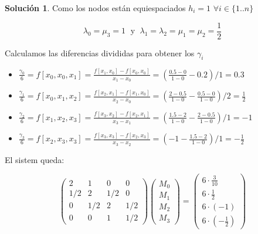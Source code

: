 \documentclass[11pt,spanish,]{article}
\theoremstyle{definition} \newtheorem*{definicion}{Definición}
\newtheorem*{solucion}{Solución}
\begin{document}
\begin{solucion}
Como los nodos están equiespaciados $h_i=1$ $\forall i \in \{1..n\}$

$$\lambda_0 = \mu_3 = 1 \; \text{ y } \; \lambda_1=\lambda_2=\mu_1=\mu_2= \frac{1}{2}$$

Calculamos las diferencias divididas para obtener los $\gamma_i$

\begin{itemize}

\item $\displaystyle\frac{\gamma_0}{6} = f[x_0,x_0,x_1] =  \frac{f[x_1,x_0]-f[x_0,x_0]}{x_1-x_0} = \left(\frac{0.5-0}{1-0}-0.2\right)/1 = 0.3$

\item $\displaystyle\frac{\gamma_1}{6} = f{[x_0,x_1,x_2]} =  \frac{f{[x_2,x_1]}-f{[x_1,x_0]} }{ x_2-x_0 } = \left(\frac{2-0.5}{1-0}-\frac{0.5-0}{1-0}\right)/2 = \frac{1}{2}$

\item $\displaystyle\frac{\gamma_2}{6} = f{[x_1,x_2,x_3]} =  \frac{ f{[x_3,x_2]}-f{[x_2,x_1]} }{ x_3-x_1 } = \left(\frac{1.5-2}{1-0}-\frac{2-0.5}{1-0}\right)/1 = -1$

\item $\displaystyle\frac{\gamma_3}{6} = f{[x_2,x_3,x_3]} =  \frac{ f{[x_3,x_3]}-f{[x_2,x_3]} }{ x_3-x_2 } = \left(-1-\frac{1.5-2}{1-0}\right)/1 = -\frac{1}{2}$
\end{itemize}

El sistem queda:

\begin{equation*}
\begin{pmatrix}
    2 & 1 & 0 & 0  \\
    1/2 & 2 & 1/2 & 0  \\
    0 & 1/2 & 2 & 1/2  \\
    0 & 0 & 1 & 1/2
\end{pmatrix}
\begin{pmatrix}
    M_0  \\
    M_1  \\
    M_2  \\
    M_3
\end{pmatrix}
=
\begin{pmatrix}
    6\cdot\frac{3}{10}  \\
    6\cdot\frac{1}{2}  \\
    6\cdot(-1)  \\
    6\cdot(-\frac{1}{2})
\end{pmatrix}
\end{equation*}


\end{solucion}
\end{document}
